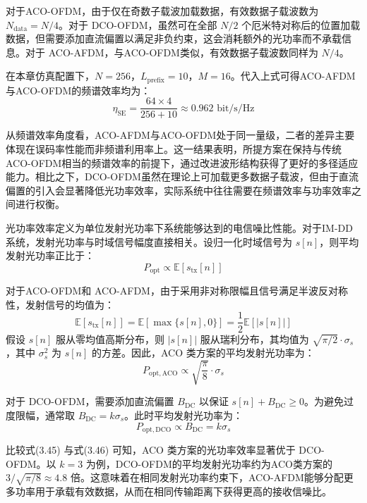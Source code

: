 对于ACO-OFDM，由于仅在奇数子载波加载数据，有效数据子载波数为 $N_{\mathrm{data}} = N/4$。对于 DCO-OFDM，虽然可在全部 $N/2$ 个厄米特对称后的位置加载数据，但需要添加直流偏置以满足非负约束，这会消耗额外的光功率而不承载信息。对于 ACO-AFDM，与ACO-OFDM类似，有效数据子载波数同样为 $N/4$。

在本章仿真配置下，$N=256$，$L_{\mathrm{prefix}}=10$，$M=16$。代入上式可得ACO-AFDM与ACO-OFDM的频谱效率均为：
\begin{equation}
\eta_{\mathrm{SE}} = \frac{64 \times 4}{256 + 10} \approx 0.962 \text{ bit/s/Hz}
\end{equation}

从频谱效率角度看，ACO-AFDM与ACO-OFDM处于同一量级，二者的差异主要体现在误码率性能而非频谱利用率上。这一结果表明，所提方案在保持与传统ACO-OFDM相当的频谱效率的前提下，通过改进波形结构获得了更好的多径适应能力。相比之下，DCO-OFDM虽然在理论上可加载更多数据子载波，但由于直流偏置的引入会显著降低光功率效率，实际系统中往往需要在频谱效率与功率效率之间进行权衡。


光功率效率定义为单位发射光功率下系统能够达到的电信噪比性能。对于IM-DD系统，发射光功率与时域信号幅度直接相关。设归一化时域信号为 $s[n]$，则平均发射光功率正比于：
\begin{equation}
P_{\mathrm{opt}} \propto \mathbb{E}[s_{\mathrm{tx}}[n]]
\end{equation}

对于ACO-OFDM和 ACO-AFDM，由于采用非对称限幅且信号满足半波反对称性，发射信号的均值为：
\begin{equation}
\mathbb{E}[s_{\mathrm{tx}}[n]] = \mathbb{E}[\max\{s[n], 0\}] = \frac{1}{2}\mathbb{E}[|s[n]|]
\end{equation}
假设 $s[n]$ 服从零均值高斯分布，则 $|s[n]|$ 服从瑞利分布，其均值为 $\sqrt{\pi/2} \cdot \sigma_s$，其中 $\sigma_s^2$ 为 $s[n]$ 的方差。因此，ACO 类方案的平均发射光功率为：
\begin{equation}
P_{\mathrm{opt,ACO}} \propto \sqrt{\frac{\pi}{8}} \cdot \sigma_s
\end{equation}

对于 DCO-OFDM，需要添加直流偏置 $B_{\mathrm{DC}}$ 以保证 $s[n] + B_{\mathrm{DC}} \geq 0$。为避免过度限幅，通常取 $B_{\mathrm{DC}} = k\sigma_s$。此时平均发射光功率为：
\begin{equation}
P_{\mathrm{opt,DCO}} \propto B_{\mathrm{DC}} = k\sigma_s
\end{equation}

比较式(3.45) 与式(3.46) 可知，ACO 类方案的光功率效率显著优于 DCO-OFDM。以 $k=3$ 为例，DCO-OFDM的平均发射光功率约为ACO类方案的 $3/\sqrt{\pi/8} \approx 4.8$ 倍。这意味着在相同发射光功率约束下，ACO-AFDM能够分配更多功率用于承载有效数据，从而在相同传输距离下获得更高的接收信噪比。

